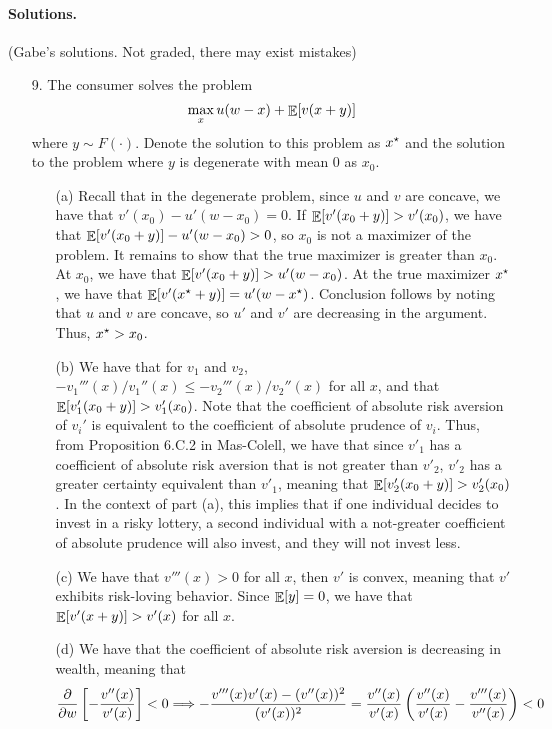 \documentclass[12pt]{article}
\begin{document}
\paragraph{Solutions.} (Gabe's solutions. Not graded, there may exist mistakes)

\begin{itemize}
	\item[9.] The consumer solves the problem
	\[
	\max_x u(w - x) + \mathop{\mathbb{E}}[v(x+y)]
	\]
	where $y \sim F(\cdot)$. Denote the solution to this problem as $x^\star$ and the solution to the problem where $y$ is degenerate with mean 0 as $x_0$.
	\begin{itemize}
		\item[(a)] Recall that in the degenerate problem, since $u$ and $v$ are concave, we have that $v'(x_0) - u'(w-x_0) = 0$. If $\mathop{\mathbb{E}}[v'(x_0 + y)] > v'(x_0)$, we have that $\mathop{\mathbb{E}}[v'(x_0 + y)] - u'(w - x_0) > 0$, so $x_0$ is not a maximizer of the problem. It remains to show that the true maximizer is greater than $x_0$. At $x_0$, we have that $\mathop{\mathbb{E}}[v'(x_0 + y)] > u'(w - x_0)$. At the true maximizer $x^\star$, we have that $\mathop{\mathbb{E}}[v'(x^\star + y)] = u'(w - x^\star)$. Conclusion follows by noting that $u$ and $v$ are concave, so $u'$ and $v'$ are decreasing in the argument. Thus, $x^\star > x_0$.
		\item[(b)] We have that for $v_1$ and $v_2$, $-v_1'''(x)/v_1''(x) \le -v_2'''(x)/v_2''(x)$ for all $x$, and that $\mathop{\mathbb{E}}[v_1'(x_0+y)] > v_1'(x_0)$. Note that the coefficient of absolute risk aversion of $v_i'$ is equivalent to the coefficient of absolute prudence of $v_i$. Thus, from Proposition 6.C.2 in Mas-Colell, we have that since $v'_1$ has a coefficient of absolute risk aversion that is not greater than $v'_2$, $v'_2$ has a greater certainty equivalent than $v'_1$, meaning that $\mathop{\mathbb{E}}[v_2'(x_0 + y)] > v_2'(x_0)$. In the context of part (a), this implies that if one individual decides to invest in a risky lottery, a second individual with a not-greater coefficient of absolute prudence will also invest, and they will not invest less.
		\item[(c)] We have that $v'''(x) > 0$ for all $x$, then $v'$ is convex, meaning that $v'$ exhibits risk-loving behavior. Since $\mathop{\mathbb{E}}[y] = 0$, we have that $\mathop{\mathbb{E}}[v'(x + y)] > v'(x)$ for all $x$.
		\item[(d)] We have that the coefficient of absolute risk aversion is decreasing in wealth, meaning that
		\[
		\frac{\partial}{\partial w} \left[ -\frac{v''(x)}{v'(x)}\right] < 0 \Longrightarrow -\frac{v'''(x)v'(x) - (v''(x))^2}{(v'(x))^2} = \frac{v''(x)}{v'(x)} \left( \frac{v''(x)}{v'(x)} - \frac{v'''(x)}{v''(x)} \right) < 0
\]
\end{itemize}
\end{itemize}
\end{document}

